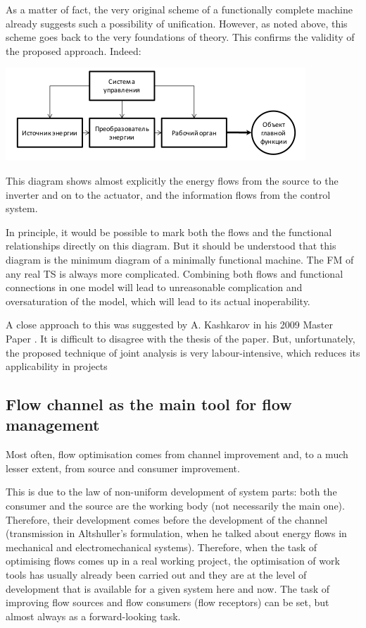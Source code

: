 \documentclass[a4paper,11pt]{article}
\begin{document}
As a matter of fact, the very original scheme of a functionally complete
machine already suggests such a possibility of unification. However, as noted
above, this scheme goes back to the very foundations of theory. This confirms
the validity of the proposed approach. Indeed:
\begin{center}
  \includegraphics[width=.8\textwidth]{5.png}
\end{center}
This diagram shows almost explicitly the energy flows from the source to the
inverter and on to the actuator, and the information flows from the control
system.

In principle, it would be possible to mark both the flows and the functional
relationships directly on this diagram. But it should be understood that this
diagram is the minimum diagram of a minimally functional machine. The FM of
any real TS is always more complicated. Combining both flows and functional
connections in one model will lead to unreasonable complication and
oversaturation of the model, which will lead to its actual inoperability.

A close approach to this was suggested by A. Kashkarov in his 2009 Master
Paper \cite{B11}. It is difficult to disagree with the thesis of the paper.
But, unfortunately, the proposed technique of joint analysis is very
labour-intensive, which reduces its applicability in projects

\subsection{Flow channel as the main tool for flow management}

Most often, flow optimisation comes from channel improvement and, to a much
lesser extent, from source and consumer improvement.

This is due to the law of non-uniform development of system parts: both the
consumer and the source are the working body (not necessarily the main
one). Therefore, their development comes before the development of the channel
(transmission in Altshuller's formulation, when he talked about energy flows
in mechanical and electromechanical systems). Therefore, when the task of
optimising flows comes up in a real working project, the optimisation of work
tools has usually already been carried out and they are at the level of
development that is available for a given system here and now. The task of
improving flow sources and flow consumers (flow receptors) can be set, but
almost always as a forward-looking task.
\end{document}

